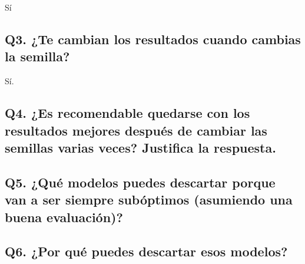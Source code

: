 \documentclass[]{article}
\begin{document}
Sí

\hypertarget{question-3}{%
	\subsection{Q3. ¿Te cambian los resultados cuando cambias la semilla?}\label{question-3}}

Sí.

\hypertarget{question-4}{%
	\subsection{Q4. ¿Es recomendable quedarse con los resultados mejores después de cambiar las semillas varias veces? Justifica la respuesta.}\label{question-4}}

\hypertarget{question-5}{%
	\subsection{Q5. ¿Qué modelos puedes descartar porque van a ser siempre subóptimos (asumiendo una buena evaluación)?}\label{question-5}}

\hypertarget{question-6}{%
	\subsection{Q6.  ¿Por qué puedes descartar esos modelos?}\label{question-6}}
\end{document}
